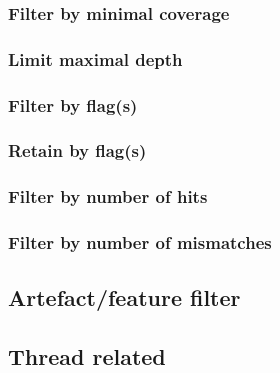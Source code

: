 \documentclass[10pt,a4paper,final]{article}
\begin{document}
\subsubsection{Filter by minimal coverage}



\subsubsection{Limit maximal depth}

\subsubsection{Filter by flag(s)}\label{sec:filter_flag}

\subsubsection{Retain by flag(s)}



\subsubsection{Filter by number of hits}



\subsubsection{Filter by number of mismatches}



\subsection{Artefact/feature filter}\label{sec:cli_artefact_filter}

\subsection{Thread related}
\end{document}
